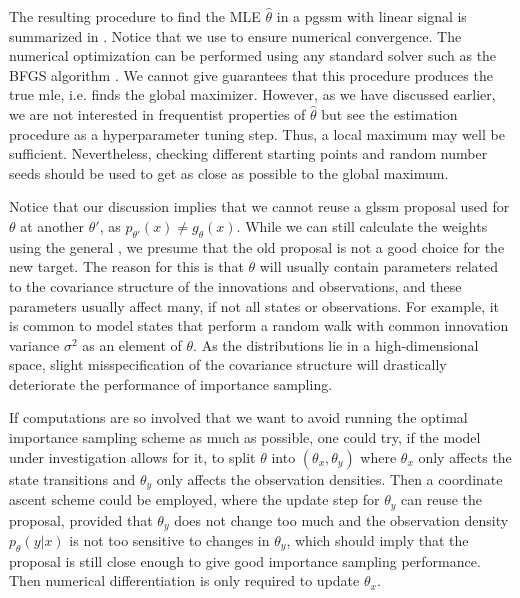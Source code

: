 The resulting procedure to find the MLE $\hat \theta$ in a \acrshort{pgssm} with linear signal is summarized in . Notice that we use  to ensure numerical convergence. The numerical optimization can be performed using any standard solver such as the BFGS algorithm \citep[Chapter 6.1]{Nocedal2006Numerical}. We cannot give guarantees that this procedure produces the true \acrshort{mle}, i.e. finds the global maximizer. However, as we have discussed earlier, we are not interested in frequentist properties of $\hat \theta$ but see the estimation procedure as a hyperparameter tuning step. Thus, a local maximum may well be sufficient. Nevertheless, checking different starting points and random number seeds should be used to get as close as possible to the global maximum.

Notice that our discussion implies that we cannot reuse a \acrshort{glssm} proposal used for $\theta$ at another $\theta'$, as $p_{\theta'}(x) \neq g_{\theta}(x)$. While we can still calculate the weights using the general , we presume that the old proposal is not a good choice for the new target. The reason for this is that $\theta$ will usually contain parameters related to the covariance structure of the innovations and observations, and these parameters usually affect many, if not all states or observations. For example, it is common to model states that perform a random walk with common innovation variance $\sigma^{2}$ as an element of $\theta$. As the distributions lie in a high-dimensional space, slight misspecification of the covariance structure will drastically deteriorate the performance of importance sampling. 

If computations are so involved that we want to avoid running the optimal importance sampling scheme as much as possible, one could try, if the model under investigation allows for it, to split $\theta$ into $(\theta_{x}, \theta_y)$ where $\theta_{x}$ only affects the state transitions and $\theta_{y}$ only affects the observation densities. Then a coordinate ascent scheme could be employed, where the update step for $\theta_{y}$ can reuse the proposal, provided that $\theta_{y}$ does not change too much and the observation density $p_{\theta}(y|x)$ is not too sensitive to changes in $\theta_{y}$, which should imply that the proposal is still close enough to give good importance sampling performance. Then numerical differentiation is only required to update $\theta_{x}$. 


